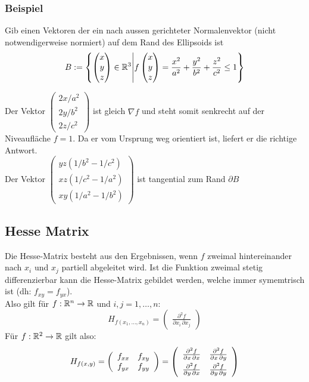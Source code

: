 \subsubsection*{Beispiel}
Gib einen Vektoren der ein nach aussen gerichteter Normalenvektor
(nicht notwendigerweise normiert) auf dem Rand des Ellipsoids ist \[
B := 
\left\{ 
	\begin{pmatrix} x\\ y\\ z \end{pmatrix} \in \mathbb{R}^3  
	\middle\vert
	f\begin{pmatrix} x\\ y\\ z \end{pmatrix} 
		= \frac{x^2}{a^2} + \frac{y^2}{b^2} + \frac{z^2}{c^2} \leq 1
\right\}
\]

Der Vektor $\begin{pmatrix} 2x/a^2\\ 2y/b^2\\ 2z/c^2 \end{pmatrix}$ ist gleich $\nabla f$ und steht somit 
senkrecht auf der Niveaufläche $f=1$. Da er vom Ursprung weg orientiert ist, liefert er die richtige Antwort.\\
Der Vektor $\begin{pmatrix} yz(1/b^2-1/c^2)\\ xz(1/c^2-1/a^2)\\ xy(1/a^2-1/b^2) \end{pmatrix}$ ist tangential 
zum Rand $\partial B$

\subsection{Hesse Matrix}
Die Hesse-Matrix besteht aus den Ergebnissen, wenn $f$ zweimal hintereinander nach $x_i$ und $x_j$ partiell abgeleitet wird. Ist die Funktion zweimal stetig differenzierbar kann die Hesse-Matrix gebildet werden, welche immer symemtrisch ist (dh: $f_{xy} = f_{yx}$). \\
Also gilt für $f: \mathbb{R}^n \to \mathbb{R}$ und $i,j = 1, \ldots, n$:
\[
	H_{f(x_1, \ldots, x_n)} = 
	\left(
		\begin{array}{c}
			\frac{\partial^2 f}{\partial x_i \, \partial x_j}
		\end{array}
	\right)
\]
Für $f: \mathbb{R}^2 \to \mathbb{R}$ gilt also:
\[
	H_{f(x, y)} = 
	\left(
		\begin{array}{cc}
			f_{xx} & f_{xy}\\
			f_{yx} & f_{yy}
		\end{array}
	\right)	=
	\left(
		\begin{array}{cc}
			\vspace{0.1cm} \frac{\partial^2 f}{\partial x \, \partial x} & \frac{\partial^2 f}{\partial x \, \partial y} \\
			\frac{\partial^2 f}{\partial y \, \partial x} & \frac{\partial^2 f}{\partial y \, \partial y}
		\end{array}
	\right)
\]

